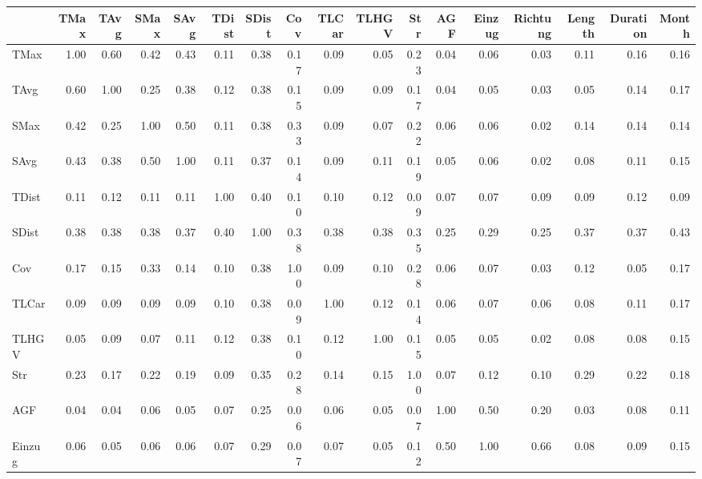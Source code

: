 \begin{tabular}{lrrrrrrrrrrrrrrrr}
\toprule
{} &  TMax &  TAvg &  SMax &  SAvg &  TDist &  SDist &  Cov &  TLCar &  TLHGV &  Str &  AGF &  Einzug &  Richtung &  Length &  Duration &  Month \\
\midrule
TMax     &  1.00 &  0.60 &  0.42 &  0.43 &   0.11 &   0.38 & 0.17 &   0.09 &   0.05 & 0.23 & 0.04 &    0.06 &      0.03 &    0.11 &      0.16 &   0.16 \\
TAvg     &  0.60 &  1.00 &  0.25 &  0.38 &   0.12 &   0.38 & 0.15 &   0.09 &   0.09 & 0.17 & 0.04 &    0.05 &      0.03 &    0.05 &      0.14 &   0.17 \\
SMax     &  0.42 &  0.25 &  1.00 &  0.50 &   0.11 &   0.38 & 0.33 &   0.09 &   0.07 & 0.22 & 0.06 &    0.06 &      0.02 &    0.14 &      0.14 &   0.14 \\
SAvg     &  0.43 &  0.38 &  0.50 &  1.00 &   0.11 &   0.37 & 0.14 &   0.09 &   0.11 & 0.19 & 0.05 &    0.06 &      0.02 &    0.08 &      0.11 &   0.15 \\
TDist    &  0.11 &  0.12 &  0.11 &  0.11 &   1.00 &   0.40 & 0.10 &   0.10 &   0.12 & 0.09 & 0.07 &    0.07 &      0.09 &    0.09 &      0.12 &   0.09 \\
SDist    &  0.38 &  0.38 &  0.38 &  0.37 &   0.40 &   1.00 & 0.38 &   0.38 &   0.38 & 0.35 & 0.25 &    0.29 &      0.25 &    0.37 &      0.37 &   0.43 \\
Cov      &  0.17 &  0.15 &  0.33 &  0.14 &   0.10 &   0.38 & 1.00 &   0.09 &   0.10 & 0.28 & 0.06 &    0.07 &      0.03 &    0.12 &      0.05 &   0.17 \\
TLCar    &  0.09 &  0.09 &  0.09 &  0.09 &   0.10 &   0.38 & 0.09 &   1.00 &   0.12 & 0.14 & 0.06 &    0.07 &      0.06 &    0.08 &      0.11 &   0.17 \\
TLHGV    &  0.05 &  0.09 &  0.07 &  0.11 &   0.12 &   0.38 & 0.10 &   0.12 &   1.00 & 0.15 & 0.05 &    0.05 &      0.02 &    0.08 &      0.08 &   0.15 \\
Str      &  0.23 &  0.17 &  0.22 &  0.19 &   0.09 &   0.35 & 0.28 &   0.14 &   0.15 & 1.00 & 0.07 &    0.12 &      0.10 &    0.29 &      0.22 &   0.18 \\
AGF      &  0.04 &  0.04 &  0.06 &  0.05 &   0.07 &   0.25 & 0.06 &   0.06 &   0.05 & 0.07 & 1.00 &    0.50 &      0.20 &    0.03 &      0.08 &   0.11 \\
Einzug   &  0.06 &  0.05 &  0.06 &  0.06 &   0.07 &   0.29 & 0.07 &   0.07 &   0.05 & 0.12 & 0.50 &    1.00 &      0.66 &    0.08 &      0.09 &   0.15 \\

\end{tabular}
